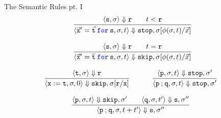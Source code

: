 \documentclass{beamer}
\newcommand{\blue}[1]{\textcolor{blue}{#1}}
\begin{document}
\begin{frame}{The Semantic Rules pt. I}
        \[
                \infer{
                        \langle \vec{\mathtt{x}}' = \vec{\mathtt{t}} \> 
                        \blue{\mathtt{for}} \> \mathtt{s}, \sigma, t \rangle
                        \Downarrow \mathtt{stop}, \sigma[\phi(\sigma,t)/\vec{x}]
                }{
                        \langle \mathtt{s}, \sigma \rangle \Downarrow \mathtt{r}
                        \qquad t < \mathtt{r}
                }
        \]

        \[
                \infer{
                        \langle \vec{\mathtt{x}}' = \overline{\mathtt{t}} \> 
                        \blue{\mathtt{for}} \> \mathtt{s}, \sigma, t \rangle
                        \Downarrow \mathtt{skip}, \sigma[\phi(\sigma,t)/\vec{x}]
                }{
                        \langle \mathtt{s}, \sigma \rangle \Downarrow \mathtt{r}
                        \qquad t = \mathtt{r}
                }
        \]

        \[
                \infer[]{
                        \langle \mathtt{x := t}, \sigma,0 \rangle \Downarrow 
                        \mathtt{skip}, \sigma[\mathtt{r} / \mathtt{x}]
                }{
                       \langle \mathtt{t}, \sigma \rangle \Downarrow \mathtt{r}
                } \hspace{1cm}
                \infer[]{
                        \langle \mathtt{p \> \blue{;} \> q}, \sigma, t \rangle \Downarrow 
                        \mathtt{stop}, \sigma'
                }{
                        \langle \mathtt{p}, \sigma, t \rangle \Downarrow \mathtt{stop}, \sigma' 
                }
        \]

        \[
                \infer[]{
                        \langle \mathtt{p \> \blue{;} \> q}, \sigma, t + t' \rangle \Downarrow 
                        \mathtt{s}, \sigma''
                }{
                        \langle \mathtt{p}, \sigma, t \rangle \Downarrow \mathtt{skip}, \sigma' 
                        \qquad
                        \langle \mathtt{q}, \sigma, t' \rangle \Downarrow \mathtt{s}, \sigma''
                }
        \]
\end{frame}
\end{document}
